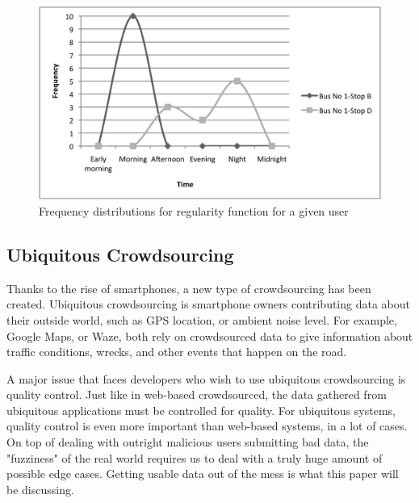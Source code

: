 \documentclass[9pt,twocolumn]{article}
\begin{document}
	\begin{figure}[h!]
		\includegraphics[width=\linewidth]{freq-dist}
		\caption{Frequency distributions for regularity function for a given user}
		\label{fig-freq}
	\end{figure}
	\subsection*{Ubiquitous Crowdsourcing}
	Thanks to the rise of smartphones, a new type of crowdsourcing has been created. Ubiquitous crowdsourcing is smartphone owners contributing data about their outside world, such as GPS location, or ambient noise level. For example, Google Maps, or Waze, both rely on crowdsourced data to give information about traffic conditions, wrecks, and other events that happen on the road. 
	
	A major issue that faces developers who wish to use ubiquitous crowdsourcing is quality control. Just like in web-based crowdsourced, the data gathered from ubiquitous applications must be controlled for quality. For ubiquitous systems, quality control is even more important than web-based systems, in a lot of cases. On top of dealing with outright malicious users submitting bad data, the "fuzziness" of the real world requires us to deal with a truly huge amount of possible edge cases. Getting usable data out of the mess is what this paper will be discussing.
\end{document}

